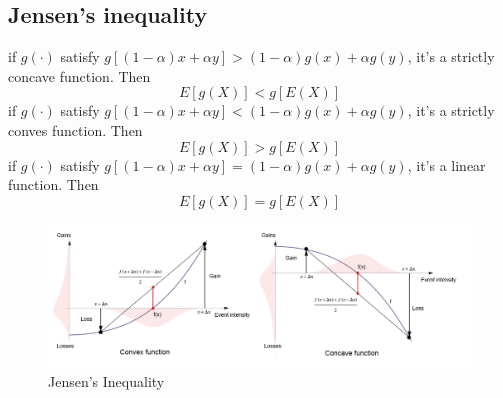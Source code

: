 \documentclass[12pt]{article}
\begin{document}
        \subsection*{Jensen's inequality}
        if $g(\cdot)$ satisfy $g[(1-\alpha)x+\alpha y] > (1-\alpha)g(x)+\alpha g(y)$, it's a strictly concave function. Then
        \begin{equation}
            E[g(X)] < g[E(X)]
        \end{equation}
        if $g(\cdot)$ satisfy $g[(1-\alpha)x+\alpha y] < (1-\alpha)g(x)+\alpha g(y)$, it's a strictly conves function. Then
        \begin{equation}
            E[g(X)] > g[E(X)]
        \end{equation}
        if $g(\cdot)$ satisfy $g[(1-\alpha)x+\alpha y] = (1-\alpha)g(x)+\alpha g(y)$, it's a linear function. Then
        \begin{equation}
            E[g(X)] = g[E(X)]
        \end{equation}
        \begin{figure}[H]
            \centering
            \includegraphics[width = \textwidth]{jensen_eng.jpeg}
            \caption{Jensen's Inequality}
        \end{figure}
\end{document}

